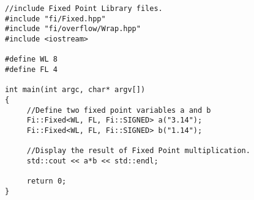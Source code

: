 \lstset{framesep=-10pt, xleftmargin=-10pt}
\begin{lstlisting}[caption={Libfi:Fixed Point Multiplication Example Code Snippet},label={listing:5}]
//include Fixed Point Library files.
#include "fi/Fixed.hpp"
#include "fi/overflow/Wrap.hpp"
#include <iostream>

#define WL 8
#define FL 4

int main(int argc, char* argv[]) 
{
     //Define two fixed point variables a and b
     Fi::Fixed<WL, FL, Fi::SIGNED> a("3.14");
     Fi::Fixed<WL, FL, Fi::SIGNED> b("1.14");
  
     //Display the result of Fixed Point multiplication.
     std::cout << a*b << std::endl;
  
     return 0;
}
\end{lstlisting}



